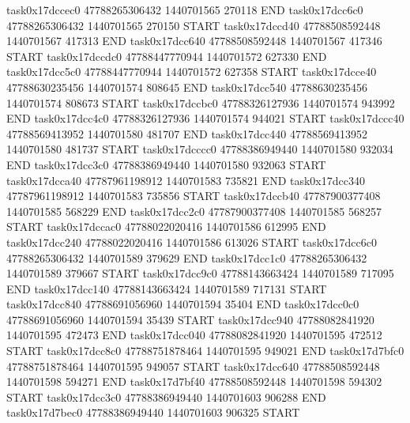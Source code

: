 task0x17dccec0 47788265306432          1440701565               270118  END
task0x17dcc6c0 47788265306432          1440701565               270150  START
task0x17dccd40 47788508592448          1440701567               417313  END
task0x17dcc640 47788508592448          1440701567               417346  START
task0x17dccdc0 47788447770944          1440701572               627330  END
task0x17dcc5c0 47788447770944          1440701572               627358  START
task0x17dcce40 47788630235456          1440701574               808645  END
task0x17dcc540 47788630235456          1440701574               808673  START
task0x17dccbc0 47788326127936          1440701574               943992  END
task0x17dcc4c0 47788326127936          1440701574               944021  START
task0x17dccc40 47788569413952          1440701580               481707  END
task0x17dcc440 47788569413952          1440701580               481737  START
task0x17dcccc0 47788386949440          1440701580               932034  END
task0x17dcc3c0 47788386949440          1440701580               932063  START
task0x17dcca40 47787961198912          1440701583               735821  END
task0x17dcc340 47787961198912          1440701583               735856  START
task0x17dccb40 47787900377408          1440701585               568229  END
task0x17dcc2c0 47787900377408          1440701585               568257  START
task0x17dccac0 47788022020416          1440701586               612995  END
task0x17dcc240 47788022020416          1440701586               613026  START
task0x17dcc6c0 47788265306432          1440701589               379629  END
task0x17dcc1c0 47788265306432          1440701589               379667  START
task0x17dcc9c0 47788143663424          1440701589               717095  END
task0x17dcc140 47788143663424          1440701589               717131  START
task0x17dcc840 47788691056960          1440701594                35404  END
task0x17dcc0c0 47788691056960          1440701594                35439  START
task0x17dcc940 47788082841920          1440701595               472473  END
task0x17dcc040 47788082841920          1440701595               472512  START
task0x17dcc8c0 47788751878464          1440701595               949021  END
task0x17d7bfc0 47788751878464          1440701595               949057  START
task0x17dcc640 47788508592448          1440701598               594271  END
task0x17d7bf40 47788508592448          1440701598               594302  START
task0x17dcc3c0 47788386949440          1440701603               906288  END
task0x17d7bec0 47788386949440          1440701603               906325  START
